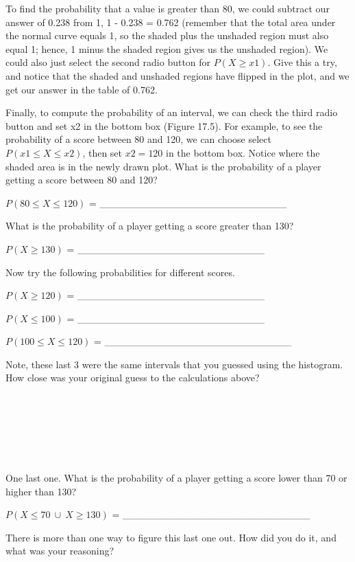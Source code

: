 \documentclass[
  openany]{scrbook}
\begin{document}
To find the probability that a value is greater than 80, we could subtract our answer of 0.238 from 1, 1 - 0.238 = 0.762 (remember that the total area under the normal curve equals 1, so the shaded plus the unshaded region must also equal 1; hence, 1 minus the shaded region gives us the unshaded region).
We could also just select the second radio button for \(P(X \geq x1)\).
Give this a try, and notice that the shaded and unshaded regions have flipped in the plot, and we get our answer in the table of 0.762.

Finally, to compute the probability of an interval, we can check the third radio button and set x2 in the bottom box (Figure 17.5).
For example, to see the probability of a score between 80 and 120, we can choose select \(P(x1 \leq X \leq x2)\), then set \(x2 = 120\) in the bottom box.
Notice where the shaded area is in the newly drawn plot.
What is the probability of a player getting a score between 80 and 120?

\(P(80 \leq X \leq 120)\) = \_\_\_\_\_\_\_\_\_\_\_\_\_\_\_\_\_\_\_\_\_\_\_\_\_\_

What is the probability of a player getting a score greater than 130?

\(P(X \geq 130)\) = \_\_\_\_\_\_\_\_\_\_\_\_\_\_\_\_\_\_\_\_\_\_\_\_\_\_

Now try the following probabilities for different scores.

\(P(X \geq 120)\) = \_\_\_\_\_\_\_\_\_\_\_\_\_\_\_\_\_\_\_\_\_\_\_\_\_\_

\(P(X \leq 100)\) = \_\_\_\_\_\_\_\_\_\_\_\_\_\_\_\_\_\_\_\_\_\_\_\_\_\_

\(P(100 \leq X \leq 120)\) = \_\_\_\_\_\_\_\_\_\_\_\_\_\_\_\_\_\_\_\_\_\_\_\_\_\_

Note, these last 3 were the same intervals that you guessed using the histogram.
How close was your original guess to the calculations above?

\begin{verbatim}






\end{verbatim}

One last one.
What is the probability of a player getting a score lower than 70 or higher than 130?

\(P(X \leq 70 \: \cup \: X \geq 130)\) = \_\_\_\_\_\_\_\_\_\_\_\_\_\_\_\_\_\_\_\_\_\_\_\_\_\_

There is more than one way to figure this last one out.
How did you do it, and what was your reasoning?
\end{document}
